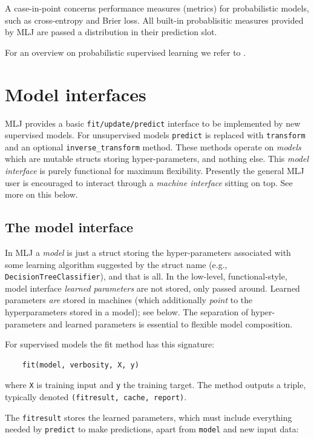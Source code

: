 \documentclass{article}
\begin{document}
A case-in-point concerns performance measures (metrics) for probabilistic models, such as cross-entropy and Brier loss. All built-in probablisitic measures provided by MLJ are passed a distribution in their prediction slot.

For an overview on probabilistic supervised learning we refer to \cite{Gressmann2018}.

\section{Model interfaces}

MLJ provides a basic \texttt{fit/update/predict} interface to be implemented by new supervised models. For unsupervised models \texttt{predict} is replaced with \texttt{transform} and an optional \texttt{inverse\_transform} method. These methods operate on \textit{models} which are mutable structs storing hyper-parameters, and nothing else. This \textit{model interface} is purely functional for maximum flexibility. Presently the general MLJ user is encouraged to interact through a \textit{machine interface} sitting on top. See more on this below.

\subsection{The model interface}

In MLJ a \textit{model} is just a struct storing the hyper-parameters associated with some learning algorithm suggested by the struct name (e.g., \texttt{DecisionTreeClassifier}), and that is all. In the low-level, functional-style, model interface \textit{learned parameters} are not stored, only passed around. Learned parameters \textit{are} stored in machines (which additionally \textit{point} to the hyperparameters stored in a model); see below. The separation of hyper-parameters and learned parameters is essential to flexible model composition.

For supervised models the fit method has this signature:

\begin{verbatim}
    fit(model, verbosity, X, y)
\end{verbatim}

where \texttt{X} is training input and \texttt{y} the training target. The method outputs a triple, typically denoted \texttt{(fitresult, cache, report)}.

The \texttt{fitresult} stores the learned parameters, which must include everything needed by \texttt{predict} to make predictions, apart from \texttt{model} and new input data:
\end{document}
